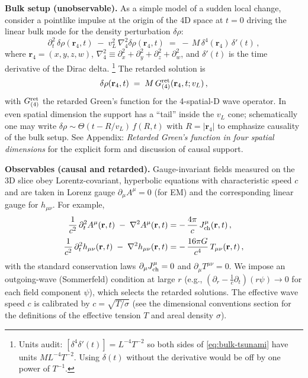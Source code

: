 \medskip
\noindent\textbf{Bulk setup (unobservable).} As a simple model of a sudden local change, consider a pointlike impulse at the origin of the 4D space at $t=0$ driving the linear bulk mode for the density perturbation $\delta\rho$:
\begin{equation}
\partial_t^2 \,\delta\rho(\mathbf r_4,t)\;-\; v_L^2 \,\nabla_4^2 \delta\rho(\mathbf r_4,t)
\;=\; -\,M\,\delta^4(\mathbf r_4)\,\delta'(t)\,,
\label{eq:bulk-tsunami}
\end{equation}
where $\mathbf r_4=(x,y,z,w)$, $\nabla_4^2\!\equiv\!\partial_x^2{+}\partial_y^2{+}\partial_z^2{+}\partial_w^2$, and $\delta'(t)$ is the time derivative of the Dirac delta.%
\footnote{Units audit: $[\delta^4\delta'(t)]=L^{-4}T^{-2}$ so both sides of \eqref{eq:bulk-tsunami} have units $ML^{-4}T^{-2}$. Using $\delta(t)$ without the derivative would be off by one power of $T^{-1}$.}
The retarded solution is
\begin{equation}
\delta\rho(\mathbf r_4,t)\;=\;M\,G^{\rm ret}_{(4)}(\mathbf r_4,t;v_L)\,,
\end{equation}
with $G^{\rm ret}_{(4)}$ the retarded Green's function for the 4-spatial-D wave operator. In even spatial dimension the support has a ``tail'' inside the $v_L$ cone; schematically one may write $\delta\rho \sim \Theta(t{-}R/v_L)\,f(R,t)$ with $R\!=\!|\mathbf r_4|$ to emphasize causality of the bulk setup. See Appendix: \emph{Retarded Green's function in four spatial dimensions} for the explicit form and discussion of causal support.

\medskip
\noindent\textbf{Observables (causal and retarded).} Gauge-invariant fields measured on the 3D slice obey Lorentz-covariant, hyperbolic equations with characteristic speed $c$ and are taken in Lorenz gauge $\partial_\mu A^\mu=0$ (for EM) and the corresponding linear gauge for $h_{\mu\nu}$. For example,
\begin{align}
\frac{1}{c^2}\,\partial_t^2 A^\mu(\mathbf r,t)\;-\;\nabla^2 A^\mu(\mathbf r,t)
&= -\,\frac{4\pi}{c}\,J^\mu_{\rm ch}(\mathbf r,t)\,, \label{eq:wave-EM}\\[2pt]
\frac{1}{c^2}\,\partial_t^2 h_{\mu\nu}(\mathbf r,t)\;-\;\nabla^2 h_{\mu\nu}(\mathbf r,t)
&= -\,\frac{16\pi G}{c^4}\,T_{\mu\nu}(\mathbf r,t)\,, \label{eq:wave-GW}
\end{align}
with the standard conservation laws $\partial_\mu J^\mu_{\rm ch}=0$ and $\partial_\mu T^{\mu\nu}=0$. We impose an outgoing-wave (Sommerfeld) condition at large $r$ (e.g., $(\partial_r-\tfrac1c\partial_t)(r\psi)\!\to\!0$ for each field component $\psi$), which selects the retarded solutions. The effective wave speed $c$ is calibrated by $c=\sqrt{T/\sigma}$ (see the dimensional conventions section for the definitions of the effective tension $T$ and areal density $\sigma$).

